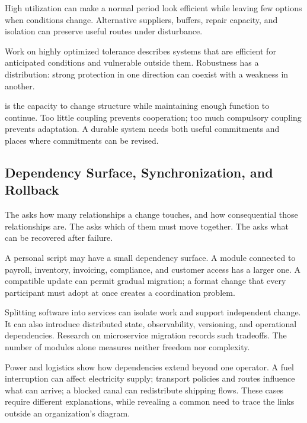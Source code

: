 High utilization can make a normal period look efficient while leaving few options when conditions change. Alternative suppliers, buffers, repair capacity, and isolation can preserve useful routes under disturbance.

Work on highly optimized tolerance describes systems that are efficient for anticipated conditions and vulnerable outside them.\cite{carlson1999highly} Robustness has a distribution: strong protection in one direction can coexist with a weakness in another.

 is the capacity to change structure while maintaining enough function to continue. Too little coupling prevents cooperation; too much compulsory coupling prevents adaptation. A durable system needs both useful commitments and places where commitments can be revised.

\subsection{Dependency Surface, Synchronization, and Rollback}


The  asks how many relationships a change touches, and how consequential those relationships are. The  asks which of them must move together. The  asks what can be recovered after failure.

A personal script may have a small dependency surface. A module connected to payroll, inventory, invoicing, compliance, and customer access has a larger one. A compatible update can permit gradual migration; a format change that every participant must adopt at once creates a coordination problem.

Splitting software into services can isolate work and support independent change. It can also introduce distributed state, observability, versioning, and operational dependencies. Research on microservice migration records such tradeoffs.\cite{taibi2018architectural} The number of modules alone measures neither freedom nor complexity.


Power and logistics show how dependencies extend beyond one operator. A fuel interruption can affect electricity supply; transport policies and routes influence what can arrive; a blocked canal can redistribute shipping flows.\cite{morison2004power,nzmfat2021,suez2021} These cases require different explanations, while revealing a common need to trace the links outside an organization's diagram.

